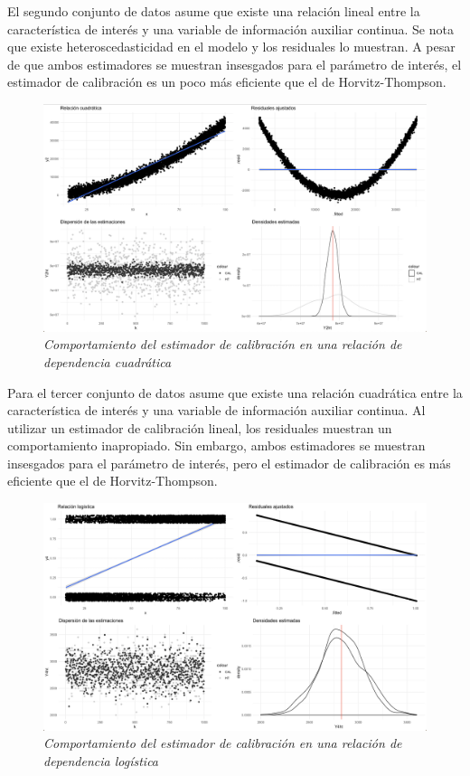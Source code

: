 \documentclass[
  10pt,
  spanish,
]{book}
\begin{document}
El segundo conjunto de datos asume que existe una relación lineal entre la característica de interés y una variable de información auxiliar continua. Se nota que existe heteroscedasticidad en el modelo y los residuales lo muestran. A pesar de que ambos estimadores se muestran insesgados para el parámetro de interés, el estimador de calibración es un poco más eficiente que el de Horvitz-Thompson.

\begin{figure}
\centering
\includegraphics{Pics/c7.png}
\caption{\emph{Comportamiento del estimador de calibración en una relación de dependencia cuadrática}}
\end{figure}

Para el tercer conjunto de datos asume que existe una relación cuadrática entre la característica de interés y una variable de información auxiliar continua. Al utilizar un estimador de calibración lineal, los residuales muestran un comportamiento inapropiado. Sin embargo, ambos estimadores se muestran insesgados para el parámetro de interés, pero el estimador de calibración es más eficiente que el de Horvitz-Thompson.

\begin{figure}
\centering
\includegraphics{Pics/c8.png}
\caption{\emph{Comportamiento del estimador de calibración en una relación de dependencia logística}}
\end{figure}
\end{document}
